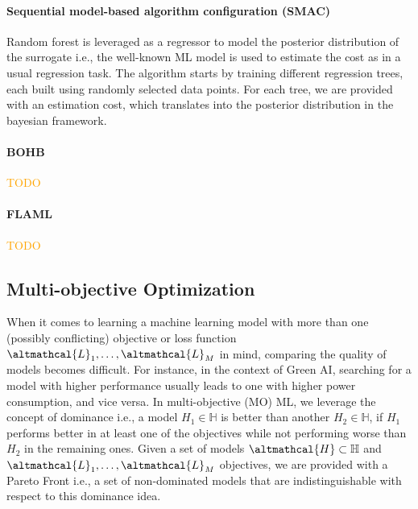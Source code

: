 \paragraph{Sequential model-based algorithm configuration (SMAC)} Random forest \cite{20} is leveraged as a regressor to model the posterior distribution of the surrogate i.e., the well-known ML model is used to estimate the cost as in a usual regression task.
The algorithm starts by training different regression trees, each built using randomly selected data points.
For each tree, we are provided with an estimation cost, which translates into the posterior distribution in the bayesian framework.

\paragraph{BOHB}
\textcolor{orange}{TODO}


\paragraph{FLAML}
\textcolor{orange}{TODO}

\subsection{Multi-objective Optimization}


When it comes to learning a machine learning model with more than one (possibly conflicting) objective or loss function $\altmathcal{L}_1, \dots, \altmathcal{L}_M$ in mind, comparing the quality of models becomes difficult.
For instance, in the context of Green AI, searching for a model with higher performance usually leads to one with higher power consumption, and vice versa.
In multi-objective (MO) ML, we leverage the concept of dominance i.e., a model $H_1 \in \mathbb{H}$ is better than another $H_2 \in \mathbb{H}$, if $H_1$ performs better in at least one of the objectives while not performing worse than $H_2$ in the remaining ones.
Given a set of models $\altmathcal{H} \subset \mathbb{H}$ and $\altmathcal{L}_1, \dots, \altmathcal{L}_M$ objectives, we are provided with a Pareto Front i.e., a set of non-dominated models that are indistinguishable with respect to this dominance idea.

